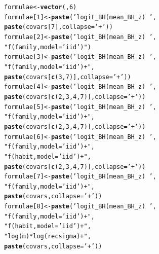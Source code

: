 \documentclass{dragonfly-report}\usepackage[]{graphicx}\usepackage[]{color}
\makeatletter
\newcommand{\hlnum}[1]{\textcolor[rgb]{0.686,0.059,0.569}{#1}}%
\newcommand{\hlstr}[1]{\textcolor[rgb]{0.192,0.494,0.8}{#1}}%
\newcommand{\hlstd}[1]{\textcolor[rgb]{0.345,0.345,0.345}{#1}}%
\newcommand{\hlkwb}[1]{\textcolor[rgb]{0.69,0.353,0.396}{#1}}%
\newcommand{\hlkwc}[1]{\textcolor[rgb]{0.333,0.667,0.333}{#1}}%
\newcommand{\hlkwd}[1]{\textcolor[rgb]{0.737,0.353,0.396}{\textbf{#1}}}%
\newenvironment{kframe}{%
 \def\at@end@of@kframe{}%
 \ifinner\ifhmode%
  \def\at@end@of@kframe{\end{minipage}}%
  \begin{minipage}{\columnwidth}%
 \fi\fi%
 \def\FrameCommand##1{\hskip\@totalleftmargin \hskip-\fboxsep
 \colorbox{shadecolor}{##1}\hskip-\fboxsep
     \hskip-\linewidth \hskip-\@totalleftmargin \hskip\columnwidth}%
 \MakeFramed {\advance\hsize-\width
   \@totalleftmargin\z@ \linewidth\hsize
   \@setminipage}}%
 {\par\unskip\endMakeFramed%
 \at@end@of@kframe}
\newenvironment{knitrout}{}{} %
\makeatother
\begin{document}
\begin{knitrout}
\begin{kframe}
\begin{alltt}
\hlstd{formulae} \hlkwb{<-} \hlkwd{vector}\hlstd{(,}\hlnum{6}\hlstd{)}
\hlstd{formulae[}\hlnum{1}\hlstd{]} \hlkwb{<-} \hlkwd{paste}\hlstd{(}\hlstr{'logit_BH(mean_BH_z) ~ '}\hlstd{,}
                     \hlkwd{paste}\hlstd{(covars[}\hlnum{7}\hlstd{],}\hlkwc{collapse} \hlstd{=} \hlstr{' + '}\hlstd{))}
\hlstd{formulae[}\hlnum{2}\hlstd{]} \hlkwb{<-} \hlkwd{paste}\hlstd{(}\hlstr{'logit_BH(mean_BH_z) ~ '}\hlstd{,}
                     \hlstr{"f(family,model='iid')"}\hlstd{)}
\hlstd{formulae[}\hlnum{3}\hlstd{]} \hlkwb{<-} \hlkwd{paste}\hlstd{(}\hlstr{'logit_BH(mean_BH_z) ~ '}\hlstd{,}
                     \hlstr{"f(family,model='iid') +"}\hlstd{,}
                     \hlkwd{paste}\hlstd{(covars[}\hlkwd{c}\hlstd{(}\hlnum{3}\hlstd{,}\hlnum{7}\hlstd{)],}\hlkwc{collapse} \hlstd{=} \hlstr{' + '}\hlstd{))}
\hlstd{formulae[}\hlnum{4}\hlstd{]} \hlkwb{<-} \hlkwd{paste}\hlstd{(}\hlstr{'logit_BH(mean_BH_z) ~ '}\hlstd{,}
                     \hlkwd{paste}\hlstd{(covars[}\hlkwd{c}\hlstd{(}\hlnum{2}\hlstd{,}\hlnum{3}\hlstd{,}\hlnum{4}\hlstd{,}\hlnum{7}\hlstd{)],}\hlkwc{collapse} \hlstd{=} \hlstr{' + '}\hlstd{))}
\hlstd{formulae[}\hlnum{5}\hlstd{]} \hlkwb{<-} \hlkwd{paste}\hlstd{(}\hlstr{'logit_BH(mean_BH_z) ~ '}\hlstd{,}
                     \hlstr{"f(family,model='iid') +"}\hlstd{,}
                     \hlkwd{paste}\hlstd{(covars[}\hlkwd{c}\hlstd{(}\hlnum{2}\hlstd{,}\hlnum{3}\hlstd{,}\hlnum{4}\hlstd{,}\hlnum{7}\hlstd{)],}\hlkwc{collapse} \hlstd{=} \hlstr{' + '}\hlstd{))}
\hlstd{formulae[}\hlnum{6}\hlstd{]} \hlkwb{<-} \hlkwd{paste}\hlstd{(}\hlstr{'logit_BH(mean_BH_z) ~ '}\hlstd{,}
                     \hlstr{"f(family,model='iid') +"}\hlstd{,}
                     \hlstr{"f(habit,model='iid') +"}\hlstd{,}
                     \hlkwd{paste}\hlstd{(covars[}\hlkwd{c}\hlstd{(}\hlnum{2}\hlstd{,}\hlnum{3}\hlstd{,}\hlnum{4}\hlstd{,}\hlnum{7}\hlstd{)],}\hlkwc{collapse} \hlstd{=} \hlstr{' + '}\hlstd{))}
\hlstd{formulae[}\hlnum{7}\hlstd{]} \hlkwb{<-} \hlkwd{paste}\hlstd{(}\hlstr{'logit_BH(mean_BH_z) ~ '}\hlstd{,}
                     \hlstr{"f(family,model='iid') +"}\hlstd{,}
                     \hlkwd{paste}\hlstd{(covars,}\hlkwc{collapse} \hlstd{=} \hlstr{' + '}\hlstd{))}
\hlstd{formulae[}\hlnum{8}\hlstd{]} \hlkwb{<-} \hlkwd{paste}\hlstd{(}\hlstr{'logit_BH(mean_BH_z) ~ '}\hlstd{,}
                     \hlstr{"f(family,model='iid') +"}\hlstd{,}
                     \hlstr{"f(habit,model='iid') +"}\hlstd{,}
                     \hlstr{"log(m)*log(recsigma) +"}\hlstd{,}
                     \hlkwd{paste}\hlstd{(covars,}\hlkwc{collapse} \hlstd{=} \hlstr{' + '}\hlstd{))}
\end{alltt}
\end{kframe}
\end{knitrout}
\end{document}
